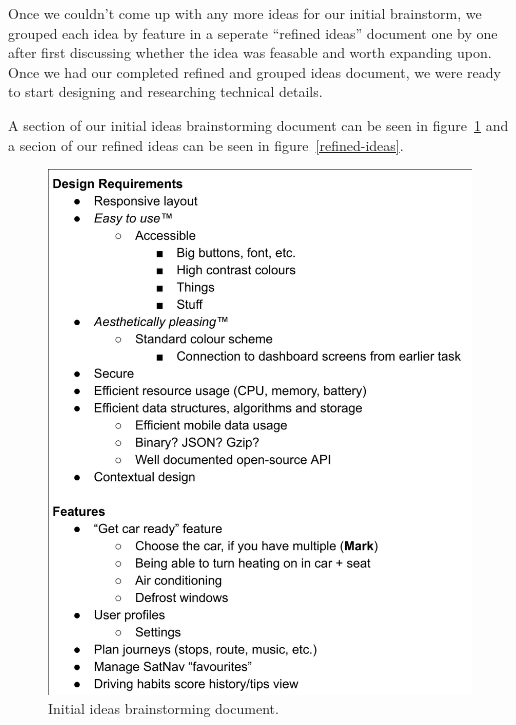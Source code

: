 \documentclass{article}
\begin{document}
Once we couldn't come up with any more ideas for our initial brainstorm, we grouped each idea by feature in a seperate ``refined ideas'' document one by one after first discussing whether the idea was feasable and worth expanding upon. Once we had our completed refined and grouped ideas document, we were ready to start designing and researching technical details.

A section of our initial ideas brainstorming document can be seen in figure~\ref{initial-ideas} and a secion of our refined ideas can be seen in figure~\ref{refined-ideas}.

\begin{figure}[H]
  \centering
  \includegraphics[scale=0.25]{initial-ideas}
  \caption{Initial ideas brainstorming document.}\label{initial-ideas}
\end{figure}
\end{document}

